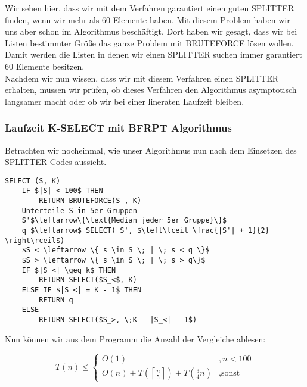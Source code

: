 \begin{description}
\begin{description}
Wir sehen hier, dass wir mit dem Verfahren garantiert einen guten SPLITTER finden, wenn wir mehr als 60 Elemente haben. Mit diesem Problem haben wir uns aber schon im Algorithmus beschäftigt. Dort haben wir gesagt, dass wir bei Listen bestimmter Größe das ganze Problem mit BRUTEFORCE lösen wollen. Damit werden die Listen in denen wir einen SPLITTER suchen immer garantiert 60 Elemente besitzen.\vspace{\baselineskip}\\
Nachdem wir nun wissen, dass wir mit diesem Verfahren einen SPLITTER erhalten, müssen wir prüfen, ob dieses Verfahren den Algorithmus asymptotisch langsamer macht oder ob wir bei einer lineraten Laufzeit bleiben.

\end{description} 

\end{description}

\subsubsection{Laufzeit K-SELECT mit BFRPT Algorithmus}

Betrachten wir nocheinmal, wie unser Algorithmus nun nach dem Einsetzen des SPLITTER Codes aussieht.

\begin{lstlisting}
SELECT (S, K)
	IF $|S| < 100$ THEN
		RETURN BRUTEFORCE(S , K)
	Unterteile S in 5er Gruppen
	S'$\leftarrow\{\text{Median jeder 5er Gruppe}\}$
	q $\leftarrow$ SELECT( S', $\left\lceil \frac{|S'| + 1}{2} \right\rceil$)
	$S_< \leftarrow \{ s \in S \; | \; s < q \}$
	$S_> \leftarrow \{ s \in S \; | \; s > q\}$
	IF $|S_<| \geq k$ THEN
		RETURN SELECT($S_<$, K)
	ELSE IF $|S_<| = K - 1$ THEN
		RETURN q
	ELSE
		RETURN SELECT($S_>, \;K - |S_<| - 1$)
\end{lstlisting}

Nun können wir aus dem Programm die Anzahl der Vergleiche ablesen:

$$
T(n) \leq \left\{ \begin{array}{lr} O(1) &, n<100\\ O(n) + T\left( \left\lceil \frac{n}{5}\right\rceil \right) + T\left( \frac{3}{4}n \right) & , \text{sonst}\end{array}\right.
$$

